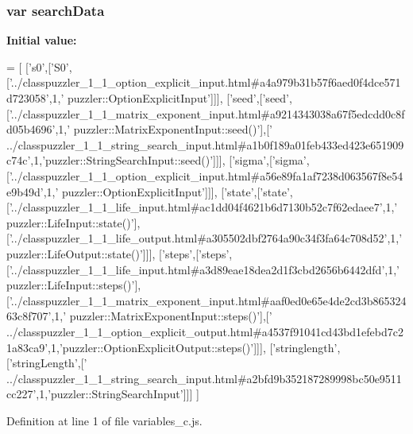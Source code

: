 \subsubsection[{search\+Data}]{\setlength{\rightskip}{0pt plus 5cm}var search\+Data}\label{a00116_ad01a7523f103d6242ef9b0451861231e}
{\bfseries Initial value\+:}
\begin{DoxyCode}
=
[
  [\textcolor{stringliteral}{'s0'},[\textcolor{stringliteral}{'S0'},[\textcolor{stringliteral}{'../classpuzzler\_1\_1\_option\_explicit\_input.html#a4a979b31b57f6aed0f4dce571d723058'},1,\textcolor{stringliteral}{'
      puzzler::OptionExplicitInput'}]]],
  [\textcolor{stringliteral}{'seed'},[\textcolor{stringliteral}{'seed'},[\textcolor{stringliteral}{'../classpuzzler\_1\_1\_matrix\_exponent\_input.html#a9214343038a67f5edcdd0c8fd05b4696'},1,\textcolor{stringliteral}{'
      puzzler::MatrixExponentInput::seed()'}],[\textcolor{stringliteral}{'
      ../classpuzzler\_1\_1\_string\_search\_input.html#a1b0f189a01feb433ed423e651909c74c'},1,\textcolor{stringliteral}{'puzzler::StringSearchInput::seed()'}]]],
  [\textcolor{stringliteral}{'sigma'},[\textcolor{stringliteral}{'sigma'},[\textcolor{stringliteral}{'../classpuzzler\_1\_1\_option\_explicit\_input.html#a56e89fa1af7238d063567f8e54e9b49d'},1,\textcolor{stringliteral}{'
      puzzler::OptionExplicitInput'}]]],
  [\textcolor{stringliteral}{'state'},[\textcolor{stringliteral}{'state'},[\textcolor{stringliteral}{'../classpuzzler\_1\_1\_life\_input.html#ac1dd04f4621b6d7130b52c7f62edaee7'},1,\textcolor{stringliteral}{'
      puzzler::LifeInput::state()'}],[\textcolor{stringliteral}{'../classpuzzler\_1\_1\_life\_output.html#a305502dbf2764a90c34f3fa64c708d52'},1,\textcolor{stringliteral}{'
      puzzler::LifeOutput::state()'}]]],
  [\textcolor{stringliteral}{'steps'},[\textcolor{stringliteral}{'steps'},[\textcolor{stringliteral}{'../classpuzzler\_1\_1\_life\_input.html#a3d89eae18dea2d1f3cbd2656b6442dfd'},1,\textcolor{stringliteral}{'
      puzzler::LifeInput::steps()'}],[\textcolor{stringliteral}{'../classpuzzler\_1\_1\_matrix\_exponent\_input.html#aaf0ed0e65e4de2cd3b86532463c8f707'},1,\textcolor{stringliteral}{'
      puzzler::MatrixExponentInput::steps()'}],[\textcolor{stringliteral}{'
      ../classpuzzler\_1\_1\_option\_explicit\_output.html#a4537f91041cd43bd1efebd7c21a83ca9'},1,\textcolor{stringliteral}{'puzzler::OptionExplicitOutput::steps()'}]]],
  [\textcolor{stringliteral}{'stringlength'},[\textcolor{stringliteral}{'stringLength'},[\textcolor{stringliteral}{'
      ../classpuzzler\_1\_1\_string\_search\_input.html#a2bfd9b352187289998bc50e9511cc227'},1,\textcolor{stringliteral}{'puzzler::StringSearchInput'}]]]
]
\end{DoxyCode}


Definition at line 1 of file variables\+\_\+c.\+js.

